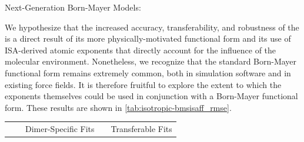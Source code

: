 \begin{subsection}{Next-Generation Born-Mayer Models: \bmsisaff}

We hypothesize that the increased accuracy, transferability, and robustness of
the \isaffold is a direct result of its more physically-motivated functional form and
its use of ISA-derived atomic exponents that directly account for the influence
of the molecular environment. Nonetheless, we recognize that the standard
Born-Mayer functional form remains extremely common, both in simulation software and in
existing force fields. It is therefore fruitful to explore the extent to which the \bsisa
exponents themselves could be used in conjunction with a Born-Mayer functional
form. These results are shown in \cref{tab:isotropic-bmsisaff_rmse}.

\begin{landscape}
\begin{table}
\footnotesize
\centering
\renewcommand\arraystretch{1.1}
\begin{tabular}{@{}rcccccccc@{}}
\hline
\toprule
& \phantom{ab} &
  \multicolumn{3}{c}{Dimer-Specific Fits} &
  \phantom{ab} &
  \multicolumn{3}{c}{Transferable Fits} \\
\cmidrule{3-5} \cmidrule{7-9}


\end{tabular}
\end{table}
\end{landscape}
\end{subsection}
